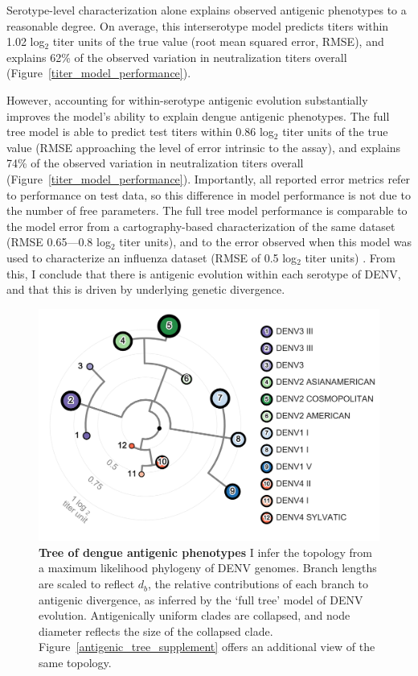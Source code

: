Serotype-level characterization alone explains observed antigenic phenotypes to a reasonable degree.
On average, this interserotype model predicts titers within 1.02 log$_2$ titer units of the true value (root mean squared error, RMSE), and explains 62\% of the observed variation in neutralization titers overall (Figure~\ref{titer_model_performance}).

However, accounting for within-serotype antigenic evolution substantially improves the model's ability to explain dengue antigenic phenotypes.
The full tree model is able to predict test titers within 0.86 log$_2$ titer units of the true value (RMSE approaching the level of error intrinsic to the assay), and explains 74\% of the observed variation in neutralization titers overall (Figure~\ref{titer_model_performance}).
Importantly, all reported error metrics refer to performance on test data, so this difference in model performance is not due to the number of free parameters.
The full tree model performance is comparable to the model error from a cartography-based characterization of the same dataset (RMSE 0.65---0.8 log$_2$ titer units), and to the error observed when this model was used to characterize an influenza dataset (RMSE of 0.5 log$_2$ titer units) \citep{katzelnick2015dengue,neher2016prediction}.
From this, I conclude that there is antigenic evolution within each serotype of DENV, and that this is driven by underlying genetic divergence.

\begin{figure}[ht!]
  \begin{centering}
    \includegraphics[width=.8\linewidth]{./png/antigenic_tree.png}
    \caption[Tree of dengue antigenic phenotypes]{\textbf{Tree of dengue antigenic phenotypes }
    I infer the topology from a maximum likelihood phylogeny of DENV genomes.
    Branch lengths are scaled to reflect $d_b$, the relative contributions of each branch to antigenic divergence, as inferred by the `full tree' model of DENV evolution.
    Antigenically uniform clades are collapsed, and node diameter reflects the size of the collapsed clade.
    Figure~\ref{antigenic_tree_supplement} offers an additional view of the same topology.
    }
     \label{antigenic_tree}
  \end{centering}
\end{figure}

